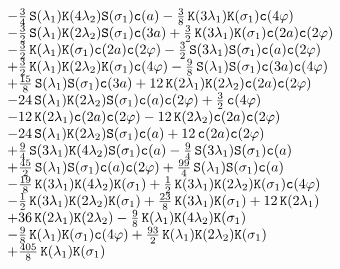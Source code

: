 \documentclass[a4paper,12pt]{article}
\begin{document}
\begin{equation}
{\begin{array}{lll}
&&-\frac{3}{4}\,\sinhx{ \lambda_1} \coshx{4 \lambda_2} \sinhx{ \sigma_1} \cosx{a}
-\frac{3}{8}\,\coshx{3 \lambda_1} \coshx{ \sigma_1} \cosx{4 \varphi}\\
&&-\frac{3}{2}\,\sinhx{ \lambda_1} \coshx{2 \lambda_2} \sinhx{ \sigma_1} \cosx{3 a}
+\frac{3}{2}\,\coshx{3 \lambda_1} \coshx{ \sigma_1} \cosx{2 a} \cosx{2 \varphi}\\
&&-\frac{3}{2}\,\coshx{ \lambda_1} \coshx{ \sigma_1} \cosx{2 a} \cosx{2 \varphi}
-\frac{3}{2}\,\sinhx{3 \lambda_1} \sinhx{ \sigma_1} \cosx{a} \cosx{2 \varphi}\\
&&+\frac{3}{2}\,\coshx{ \lambda_1} \coshx{2 \lambda_2} \coshx{ \sigma_1} \cosx{4 \varphi}
-\frac{9}{8}\,\sinhx{ \lambda_1} \sinhx{ \sigma_1} \cosx{3 a} \cosx{4 \varphi}\\
&&+\frac{15}{8}\,\sinhx{ \lambda_1} \sinhx{ \sigma_1} \cosx{3 a}
+12\,\coshx{2 \lambda_1} \coshx{2 \lambda_2} \cosx{2 a} \cosx{2 \varphi}\\
&&-24\,\sinhx{ \lambda_1} \coshx{2 \lambda_2} \sinhx{ \sigma_1} \cosx{a} \cosx{2 \varphi}
+\frac{3}{2}\,\cosx{4 \varphi}\\
&&-12\,\coshx{2 \lambda_1} \cosx{2 a} \cosx{2 \varphi}
-12\,\coshx{2 \lambda_2} \cosx{2 a} \cosx{2 \varphi}\\
&&-24\,\sinhx{ \lambda_1} \coshx{2 \lambda_2} \sinhx{ \sigma_1} \cosx{a}
+12\,\cosx{2 a} \cosx{2 \varphi}\\
&&+\frac{9}{4}\,\sinhx{3 \lambda_1} \coshx{4 \lambda_2} \sinhx{ \sigma_1} \cosx{a}
-\frac{9}{4}\,\sinhx{3 \lambda_1} \sinhx{ \sigma_1} \cosx{a}\\
&&+\frac{45}{2}\,\sinhx{ \lambda_1} \sinhx{ \sigma_1} \cosx{a} \cosx{2 \varphi}
+\frac{99}{4}\,\sinhx{ \lambda_1} \sinhx{ \sigma_1} \cosx{a}\\
&&-\frac{19}{8}\,\coshx{3 \lambda_1} \coshx{4 \lambda_2} \coshx{ \sigma_1}
+\frac{1}{2}\,\coshx{3 \lambda_1} \coshx{2 \lambda_2} \coshx{ \sigma_1} \cosx{4 \varphi}\\
&&-\frac{1}{2}\,\coshx{3 \lambda_1} \coshx{2 \lambda_2} \coshx{ \sigma_1}
+\frac{23}{8}\,\coshx{3 \lambda_1} \coshx{ \sigma_1}
+12\,\coshx{2 \lambda_1}\\
&&+36\,\coshx{2 \lambda_1} \coshx{2 \lambda_2}
-\frac{9}{8}\,\coshx{ \lambda_1} \coshx{4 \lambda_2} \coshx{ \sigma_1}\\
&&-\frac{9}{8}\,\coshx{ \lambda_1} \coshx{ \sigma_1} \cosx{4 \varphi}
+\frac{93}{2}\,\coshx{ \lambda_1} \coshx{2 \lambda_2} \coshx{ \sigma_1}\\
&&+\frac{405}{8}\,\coshx{ \lambda_1} \coshx{ \sigma_1}

\end{array}}
\end{equation}
\end{document}

